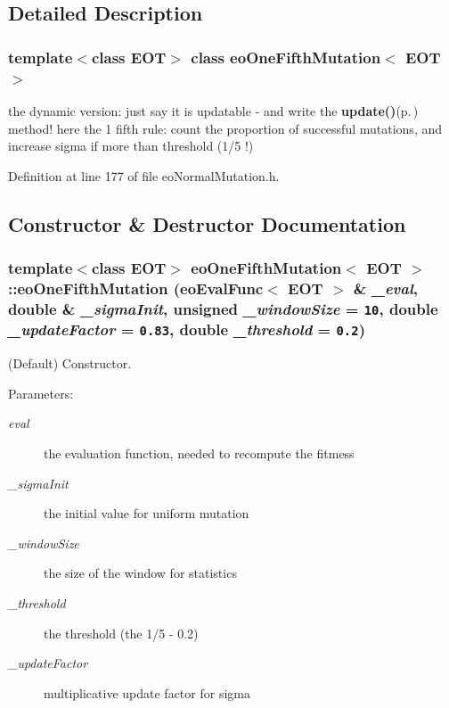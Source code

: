 \subsection{Detailed Description}
\subsubsection*{template$<$class EOT$>$ class eo\-One\-Fifth\-Mutation$<$ EOT $>$}

the dynamic version: just say it is updatable - and write the {\bf update()}{\rm (p.\,\pageref{classeo_one_fifth_mutation_a3})} method! here the 1 fifth rule: count the proportion of successful mutations, and increase sigma if more than threshold (1/5 !) 



Definition at line 177 of file eo\-Normal\-Mutation.h.

\subsection{Constructor \& Destructor Documentation}
\subsubsection{\setlength{\rightskip}{0pt plus 5cm}template$<$class EOT$>$ {\bf eo\-One\-Fifth\-Mutation}$<$ {\bf EOT} $>$::{\bf eo\-One\-Fifth\-Mutation} ({\bf eo\-Eval\-Func}$<$ {\bf EOT} $>$ \& {\em \_\-eval}, double \& {\em \_\-sigma\-Init}, unsigned {\em \_\-window\-Size} = {\tt 10}, double {\em \_\-update\-Factor} = {\tt 0.83}, double {\em \_\-threshold} = {\tt 0.2})\hspace{0.3cm}{\tt  [inline]}}\label{classeo_one_fifth_mutation_a0}


(Default) Constructor. 

\begin{Desc}
\item[Parameters:]
\begin{description}
\item[{\em eval}]the evaluation function, needed to recompute the fitmess \item[{\em \_\-sigma\-Init}]the initial value for uniform mutation \item[{\em \_\-window\-Size}]the size of the window for statistics \item[{\em \_\-threshold}]the threshold (the 1/5 - 0.2) \item[{\em \_\-update\-Factor}]multiplicative update factor for sigma \end{description}
\end{Desc}


